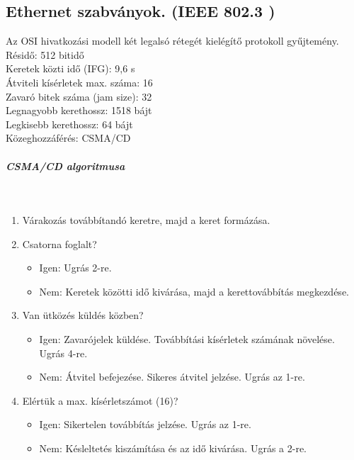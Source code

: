 \subsection{Ethernet szabványok. (IEEE 802.3 )}
Az OSI hivatkozási modell két legalsó rétegét kielégítő protokoll gyűjtemény.\\
Résidő: 512 bitidő\\
Keretek közti idő (IFG): 9,6 \textmu s\\
Átviteli kísérletek max. száma: 16\\
Zavaró bitek száma (jam size): 32\\
Legnagyobb kerethossz: 1518 bájt\\
Legkisebb kerethossz: 64 bájt\\
Közeghozzáférés: CSMA/CD\\
\subparagraph{CSMA/CD algoritmusa}~\\
\begin{enumerate}[nosep]
	\item Várakozás továbbítandó keretre, majd a keret formázása.
	\item Csatorna foglalt?
	\begin{itemize}[nosep]
		\item Igen: Ugrás 2-re.
		\item Nem: Keretek közötti idő kivárása, majd a kerettovábbítás megkezdése.
	\end{itemize}
	\item Van ütközés küldés közben?
	\begin{itemize}[nosep]
		\item Igen: Zavarójelek küldése. Továbbítási kísérletek számának növelése. Ugrás 4-re.
		\item Nem: Átvitel befejezése. Sikeres átvitel jelzése. Ugrás az 1-re.
	\end{itemize}
	\item Elértük a max. kísérletszámot (16)?
	\begin{itemize}[nosep]
		\item Igen: Sikertelen továbbítás jelzése. Ugrás az 1-re.
		\item Nem: Késleltetés kiszámítása és az idő kivárása. Ugrás a 2-re.
	\end{itemize}
\end{enumerate}


